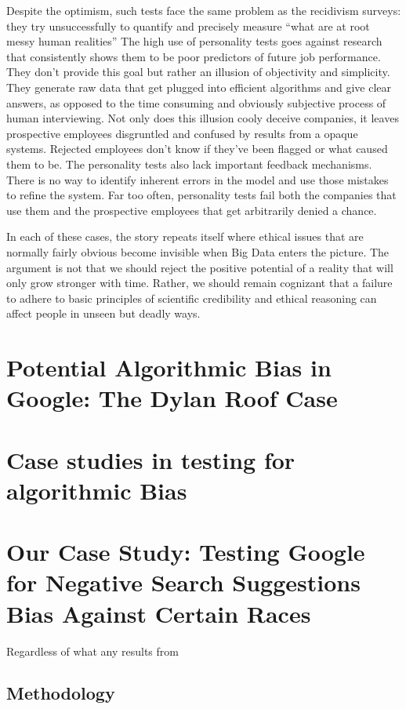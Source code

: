 \documentclass[sigconf]{acmart}
\begin{document}
Despite the optimism, such tests face the same problem as the recidivism surveys: they try unsuccessfully to quantify and precisely measure ``what are at root messy human realities''\cite{Wharton2016} The high use of personality tests goes against research that consistently shows them to be poor predictors of future job performance. They don't provide this goal but rather an illusion of objectivity and simplicity. They generate raw data that get plugged into efficient algorithms and give clear answers, as opposed to the time consuming and obviously subjective process of human interviewing. Not only does this illusion cooly deceive companies, it leaves prospective employees disgruntled and confused by results from a opaque systems. Rejected employees don't know if they've been flagged or what caused them to be. The personality tests also lack important feedback mechanisms. There is no way to identify inherent errors in the model and use those mistakes to refine the system\cite{Wharton2016}. Far too often, personality tests fail both the companies that use them and the prospective employees that get arbitrarily denied a chance.

In each of these cases, the story repeats itself where ethical issues that are normally fairly obvious become invisible when Big Data enters the picture. The argument is not that we should reject the positive potential of a reality that will only grow stronger with time. Rather, we should remain cognizant that a failure to adhere to basic principles of scientific credibility and ethical reasoning can affect people in unseen but deadly ways.


\section{Potential Algorithmic Bias in Google: The Dylan Roof Case}

\section{Case studies in testing for algorithmic Bias}

\section{Our Case Study: Testing Google for Negative Search Suggestions Bias Against Certain Races}

Regardless of what any results from 

\subsection{Methodology}
\end{document}
